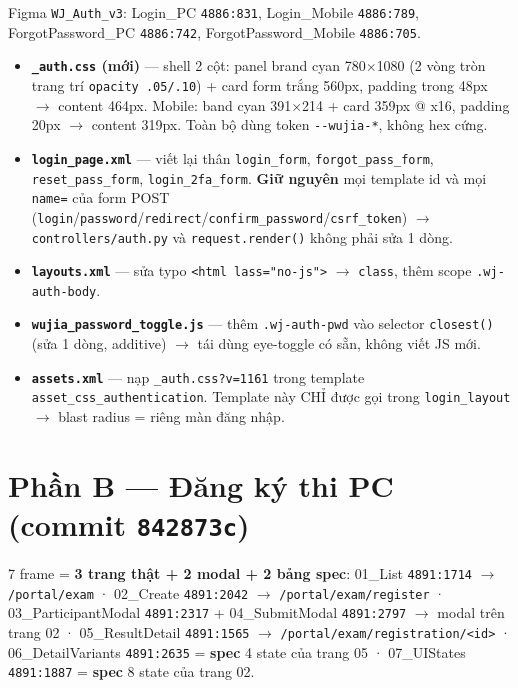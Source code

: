 Figma \texttt{WJ\_Auth\_v3}: Login\_PC \texttt{4886:831}, Login\_Mobile \texttt{4886:789},
ForgotPassword\_PC \texttt{4886:742}, ForgotPassword\_Mobile \texttt{4886:705}.

\begin{itemize}
  \item \textbf{\texttt{\_auth.css} (mới)} --- shell 2 cột: panel brand cyan 780$\times$1080 (2 vòng tròn
    trang trí \texttt{opacity .05/.10}) + card form trắng 560px, padding trong 48px $\to$ content 464px.
    Mobile: band cyan 391$\times$214 + card 359px @ x16, padding 20px $\to$ content 319px. Toàn bộ dùng
    token \texttt{-{}-wujia-*}, không hex cứng.
  \item \textbf{\texttt{login\_page.xml}} --- viết lại thân \texttt{login\_form}, \texttt{forgot\_pass\_form},
    \texttt{reset\_pass\_form}, \texttt{login\_2fa\_form}. \textbf{Giữ nguyên} mọi template id và mọi
    \texttt{name=} của form POST (\texttt{login}/\texttt{password}/\texttt{redirect}/\texttt{confirm\_password}/\texttt{csrf\_token})
    $\to$ \texttt{controllers/auth.py} và \texttt{request.render()} không phải sửa 1 dòng.
  \item \textbf{\texttt{layouts.xml}} --- sửa typo \texttt{<html lass="no-js">} $\to$ \texttt{class}, thêm
    scope \texttt{.wj-auth-body}.
  \item \textbf{\texttt{wujia\_password\_toggle.js}} --- thêm \texttt{.wj-auth-pwd} vào selector
    \texttt{closest()} (sửa 1 dòng, additive) $\to$ tái dùng eye-toggle có sẵn, không viết JS mới.
  \item \textbf{\texttt{assets.xml}} --- nạp \texttt{\_auth.css?v=1161} trong template
    \texttt{asset\_css\_authentication}. Template này CHỈ được gọi trong \texttt{login\_layout}
    $\to$ blast radius = riêng màn đăng nhập.
\end{itemize}

\section{Phần B --- Đăng ký thi PC (commit \texttt{842873c})}

7 frame = \textbf{3 trang thật + 2 modal + 2 bảng spec}:
01\_List \texttt{4891:1714} $\to$ \texttt{/portal/exam} ·
02\_Create \texttt{4891:2042} $\to$ \texttt{/portal/exam/register} ·
03\_ParticipantModal \texttt{4891:2317} + 04\_SubmitModal \texttt{4891:2797} $\to$ modal trên trang 02 ·
05\_ResultDetail \texttt{4891:1565} $\to$ \texttt{/portal/exam/registration/<id>} ·
06\_DetailVariants \texttt{4891:2635} = \textbf{spec} 4 state của trang 05 ·
07\_UIStates \texttt{4891:1887} = \textbf{spec} 8 state của trang 02.

